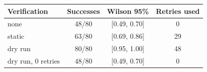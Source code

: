 \begin{tabular}{lccc}
\toprule
Verification & Successes & Wilson 95\% & Retries used \\
\midrule
none & 48/80 & [0.49, 0.70] & 0 \\
static & 63/80 & [0.69, 0.86] & 29 \\
dry run & 80/80 & [0.95, 1.00] & 48 \\
dry run, 0 retries & 48/80 & [0.49, 0.70] & 0 \\
\bottomrule
\end{tabular}
